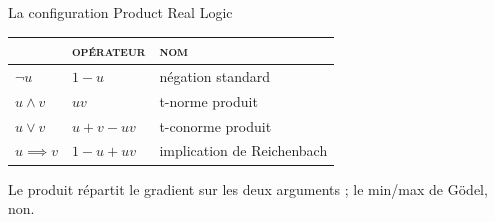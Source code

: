 \documentclass[aspectratio=169,10pt]{beamer}
\begin{document}
\begin{frame}{La configuration Product Real Logic}
  \begin{center}
  \footnotesize
  \renewcommand{\arraystretch}{1.7}
  \begin{tabular}{@{} >{\centering\arraybackslash}p{2.0cm}
                       >{\centering\arraybackslash}p{2.2cm}
                       >{\raggedright\arraybackslash}p{3.4cm} @{}}
    \toprule
    {\color{ash}\scshape\footnotesize connecteur} &
    {\color{ash}\scshape\footnotesize opérateur} &
    {\color{ash}\scshape\footnotesize nom} \\
    \midrule
    $\lnot u$ & $1-u$ & négation standard \\
    $u \land v$ & $uv$ & t-norme produit \\
    $u \lor v$ & $u+v-uv$ & t-conorme produit \\
    $u \implies v$ & $1-u+uv$ & implication de Reichenbach \\
    \bottomrule
  \end{tabular}
  \end{center}

  \vspace{0.7em}
  \begin{center}
    \small Le produit répartit le \alert{gradient} sur les deux arguments ;
    le min/max de Gödel, non.
  \end{center}
\end{frame}
\end{document}
